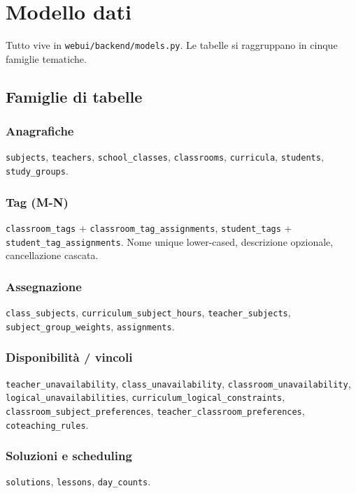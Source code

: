 \chapter{Modello dati}
\label{ch:modello_dati}

Tutto vive in \texttt{webui/backend/models.py}. Le tabelle si
raggruppano in cinque famiglie tematiche.

\section{Famiglie di tabelle}

\subsection*{Anagrafiche}
\texttt{subjects}, \texttt{teachers}, \texttt{school\_classes},
\texttt{classrooms}, \texttt{curricula}, \texttt{students},
\texttt{study\_groups}.

\subsection*{Tag (M-N)}
\texttt{classroom\_tags} + \texttt{classroom\_tag\_assignments},
\texttt{student\_tags} + \texttt{student\_tag\_assignments}. Nome
unique lower-cased, descrizione opzionale, cancellazione cascata.

\subsection*{Assegnazione}
\texttt{class\_subjects}, \texttt{curriculum\_subject\_hours},
\texttt{teacher\_subjects}, \texttt{subject\_group\_weights},
\texttt{assignments}.

\subsection*{Disponibilit\`a / vincoli}
\texttt{teacher\_unavailability}, \texttt{class\_unavailability},
\texttt{classroom\_unavailability},
\texttt{logical\_unavailabilities},
\texttt{curriculum\_logical\_constraints},
\texttt{classroom\_subject\_preferences},
\texttt{teacher\_classroom\_preferences},
\texttt{coteaching\_rules}.

\subsection*{Soluzioni e scheduling}
\texttt{solutions}, \texttt{lessons}, \texttt{day\_counts}.

